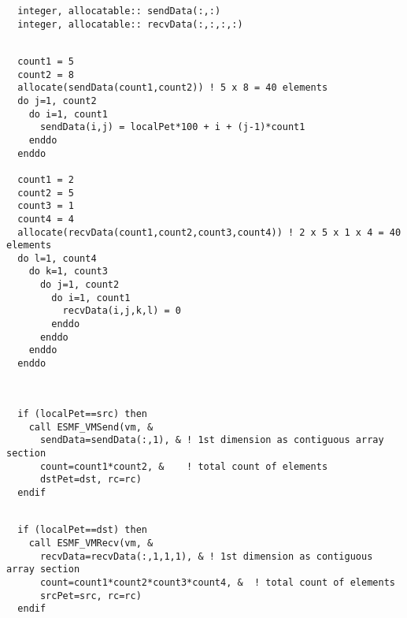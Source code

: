  \begin{verbatim}
  integer, allocatable:: sendData(:,:)
  integer, allocatable:: recvData(:,:,:,:)
 
\end{verbatim}
 

 \begin{verbatim}
  count1 = 5
  count2 = 8
  allocate(sendData(count1,count2)) ! 5 x 8 = 40 elements
  do j=1, count2
    do i=1, count1
      sendData(i,j) = localPet*100 + i + (j-1)*count1
    enddo
  enddo
  
  count1 = 2
  count2 = 5
  count3 = 1
  count4 = 4
  allocate(recvData(count1,count2,count3,count4)) ! 2 x 5 x 1 x 4 = 40 elements
  do l=1, count4
    do k=1, count3
      do j=1, count2
        do i=1, count1
          recvData(i,j,k,l) = 0
        enddo
      enddo
    enddo
  enddo
  
 
\end{verbatim}
 

 \begin{verbatim}
  if (localPet==src) then
    call ESMF_VMSend(vm, &
      sendData=sendData(:,1), & ! 1st dimension as contiguous array section
      count=count1*count2, &    ! total count of elements
      dstPet=dst, rc=rc)
  endif
 
\end{verbatim}
 

 \begin{verbatim}
  if (localPet==dst) then
    call ESMF_VMRecv(vm, &
      recvData=recvData(:,1,1,1), & ! 1st dimension as contiguous array section
      count=count1*count2*count3*count4, &  ! total count of elements
      srcPet=src, rc=rc)
  endif
 
\end{verbatim}

\setlength{\parskip}{\oldparskip}
\setlength{\parindent}{\oldparindent}
\setlength{\baselineskip}{\oldbaselineskip}
